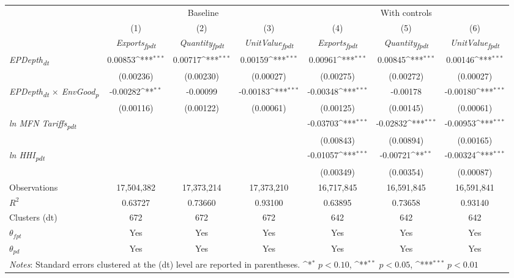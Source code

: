 {
\def\sym#1{\ifmmode^{#1}\else\(^{#1}\)\fi}
\begin{tabular}{l*{6}{c}}
\toprule
&\multicolumn{3}{c}{Baseline}&\multicolumn{3}{c}{With controls}\\\cmidrule(lr){2-4}\cmidrule(lr){5-7}
&(1)&(2)&(3)&(4)&(5)&(6)\\
&\textit{Exports\textsubscript{fpdt}}&\textit{Quantity\textsubscript{fpdt}}&\textit{UnitValue\textsubscript{fpdt}}&\textit{Exports\textsubscript{fpdt}}&\textit{Quantity\textsubscript{fpdt}}&\textit{UnitValue\textsubscript{fpdt}}\\
\midrule
\textit{EPDepth\textsubscript{dt}} & 0.00853\sym{***} & 0.00717\sym{***} & 0.00159\sym{***} & 0.00961\sym{***} & 0.00845\sym{***} & 0.00146\sym{***}\\
 & (0.00236) & (0.00230) & (0.00027) & (0.00275) & (0.00272) & (0.00027)\\
\addlinespace
\textit{EPDepth\textsubscript{dt} $\times$ EnvGood\textsubscript{p}} & -0.00282\sym{**} & -0.00099 & -0.00183\sym{***} & -0.00348\sym{***} & -0.00178 & -0.00180\sym{***}\\
 & (0.00116) & (0.00122) & (0.00061) & (0.00125) & (0.00145) & (0.00061)\\
\addlinespace
\textit{ln MFN Tariffs\textsubscript{pdt}} &  &  &  & -0.03703\sym{***} & -0.02832\sym{***} & -0.00953\sym{***}\\
 &  &  &  & (0.00843) & (0.00894) & (0.00165)\\
\addlinespace
\textit{ln HHI\textsubscript{pdt}} &  &  &  & -0.01057\sym{***} & -0.00721\sym{**} & -0.00324\sym{***}\\
 &  &  &  & (0.00349) & (0.00354) & (0.00087)\\
\midrule
Observations & 17,504,382 & 17,373,214 & 17,373,210 & 16,717,845 & 16,591,845 & 16,591,841\\
$R^{2}$ & 0.63727 & 0.73660 & 0.93100 & 0.63895 & 0.73658 & 0.93140\\
Clusters (dt) & 672 & 672 & 672 & 642 & 642 & 642\\
$\theta_{fpt}$ & Yes & Yes & Yes & Yes & Yes & Yes\\
$\theta_{pd}$ & Yes & Yes & Yes & Yes & Yes & Yes\\
\bottomrule
\multicolumn{7}{l}{\footnotesize \textit{Notes}: Standard errors clustered at the (dt) level are reported in parentheses. \sym{*} \(p<0.10\), \sym{**} \(p<0.05\), \sym{***} \(p<0.01\)}\\
\end{tabular}
}
